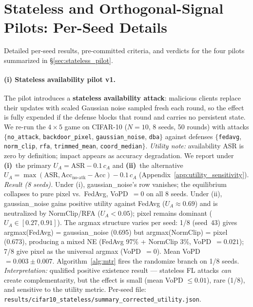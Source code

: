 \documentclass{article}
\begin{document}
\section{Stateless and Orthogonal-Signal Pilots: Per-Seed Details}
\label{app:pilot_details}

Detailed per-seed results, pre-committed criteria, and verdicts for the four pilots summarized in §\ref{sec:stateless_pilot}.

\paragraph{(i) Stateless availability pilot v1.} The pilot introduces a \textbf{stateless availability attack}: malicious clients replace their updates with scaled Gaussian noise sampled fresh each round, so the effect is fully expended if the defense blocks that round and carries no persistent state. We re-run the $4{\times}5$ game on CIFAR-10 ($N{=}10$, 8 seeds, 50 rounds) with attacks $\{$\texttt{no\_attack}, \texttt{backdoor\_pixel}, \texttt{gaussian\_noise}, \texttt{dba}$\}$ against defenses $\{$\texttt{fedavg}, \texttt{norm\_clip}, \texttt{rfa}, \texttt{trimmed\_mean}, \texttt{coord\_median}$\}$. \emph{Utility note:} availability ASR is zero by definition; impact appears as accuracy degradation. We report under \textbf{(i)}~the primary $U_A = \text{ASR} - 0.1\,c_A$ and \textbf{(ii)}~the alternative $U_A = \max(\text{ASR}, \text{Acc}_{\text{no-atk}} - \text{Acc}) - 0.1\,c_A$ (Appendix~\ref{app:utility_sensitivity}). \emph{Result (8 seeds).} Under (i), gaussian\_noise's row vanishes; the equilibrium collapses to pure pixel vs.\ FedAvg, VoPD~$=0$ on all 8 seeds. Under (ii), gaussian\_noise gains positive utility against FedAvg ($U_A \approx 0.69$) and is neutralized by NormClip/RFA ($U_A < 0.05$); pixel remains dominant ($U_A \in [0.27, 0.91]$). The argmax structure varies per seed: 1/8 (seed~43) gives argmax(FedAvg) = gaussian\_noise (0.695) but argmax(NormClip) = pixel (0.673), producing a mixed NE (FedAvg 97\% + NormClip 3\%, VoPD~$=0.021$); 7/8 give pixel as the universal argmax (VoPD~$=0$). Mean VoPD $= 0.003 \pm 0.007$. Algorithm~\ref{alg:mtr} fires the randomize branch on 1/8 seeds. \emph{Interpretation:} qualified positive existence result --- stateless FL attacks \emph{can} create complementarity, but the effect is small (mean VoPD ${\leq}0.01$), rare (1/8), and sensitive to the utility metric. Per-seed file: \texttt{results/cifar10\_stateless/summary\_corrected\_utility.json}.
\end{document}
